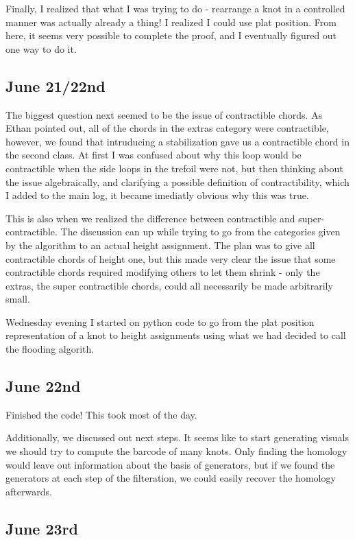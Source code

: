 \documentclass[11pt,oneside]{amsart}
\begin{document}
Finally, I realized that what I was trying to do - rearrange a knot in a controlled manner was actually already a thing! I realized I could use plat position. From here, it seems very possible to complete the proof, and I eventually figured out one way to do it.


\subsection{June 21/22nd}

The biggest question next seemed to be the issue of contractible chords. As Ethan pointed out, all of the chords in the extras category were contractible, however, we found that intruducing a stabilization gave us a contractible chord in the second class. At first I was confused about why this loop would be contractible when the side loops in the trefoil were not, but then thinking about the issue algebraically, and clarifying a possible definition of contractibility, which I added to the main log, it became imediatly obvious why this was true. 

This is also when we realized the difference between contractible and super-contractible. The discussion can up while trying to go from the categories given by the algorithm to an actual height assignment. The plan was to give all contractible chords of height one, but this made very clear the issue that some contractible chords required modifying others to let them shrink - only the extras, the super contractible chords, could all necessarily be made arbitrarily small. 

Wednesday evening I started on python code to go from the plat position representation of a knot to height assignments using what we had decided to call the flooding algorith.


\subsection{June 22nd}

Finished the code! This took most of the day. 

Additionally, we discussed out next steps. It seems like to start generating visuals we should try to compute the barcode of many knots. Only finding the homology would leave out information about the basis of generators, but if we found the generators at each step of the filteration, we could easily recover the homology afterwards.


\subsection{June 23rd}
\end{document}
